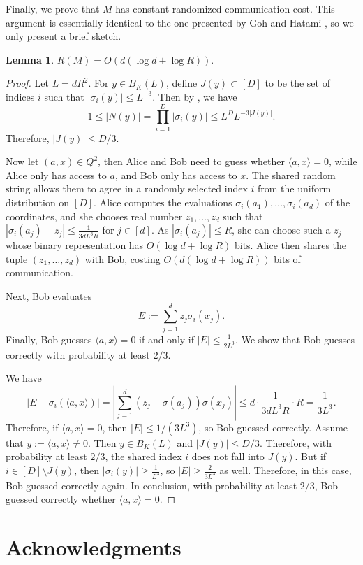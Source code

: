 \documentclass[11pt]{article}
\theoremstyle{plain}
\newtheorem{lemma}[theorem]{Lemma}
\theoremstyle{definition}
\begin{document}
	Finally, we prove that $M$ has constant randomized communication cost. This argument is essentially identical to the one presented by Goh and Hatami \cite{GH_totally_real}, so we only present a brief sketch.
	
	\begin{lemma}
		$R(M)=O(d(\log d+\log R)).$
	\end{lemma}
	
	\begin{proof}
		Let $L=dR^2$. For $y\in B_K(L)$, define $J(y)\subset [D]$ to be the set of indices $i$ such that $|\sigma_i(y)|\leq L^{-3}$. Then by , we have
		$$1\leq |N(y)|=\prod_{i=1}^D |\sigma_i(y)|\leq L^D L^{-3|J(y)|}.$$
		Therefore, $|J(y)|\leq D/3$.
		
		Now let $(a,x)\in Q^2$, then Alice and Bob need to guess whether $\langle a,x\rangle=0$, while Alice only has access to $a$, and Bob only has access to $x$. The shared random string allows them to agree in a randomly selected index $i$  from the uniform distribution on $[D]$. Alice computes the evaluations $\sigma_i(a_1),\dots,\sigma_i(a_d)$ of the coordinates, and she chooses real number $z_1,\dots,z_d$ such that $|\sigma_i(a_j)-z_j|\leq \frac{1}{3dL^3R}$ for $j\in [d]$. As $|\sigma_i(a_j)|\leq R$, she can choose such a $z_j$ whose binary representation has $O(\log d+\log R)$ bits. Alice then shares the tuple $(z_1,\dots,z_d)$ with Bob, costing $O(d(\log d+\log R))$ bits of communication.
		
		Next, Bob evaluates 
		$$E:=\sum_{j=1}^d z_j \sigma_i(x_j).$$
		Finally, Bob guesses $\langle a,x\rangle=0$ if and only if $|E|\leq \frac{1}{2L^3}$. We show that Bob guesses correctly with probability at least $2/3$.
		
		We have
		$$|E-\sigma_i(\langle a,x\rangle)|=\left|\sum_{j=1}^d (z_j-\sigma(a_j))\sigma(x_j)\right|\leq d\cdot \frac{1}{3dL^3R}\cdot R=\frac{1}{3L^3}.$$
		Therefore, if $\langle a,x\rangle=0$, then $|E|\leq 1/(3L^3)$, so Bob guessed correctly. Assume that $y:=\langle a,x\rangle\neq 0$. Then $y\in B_K(L)$ and $|J(y)|\leq D/3$. Therefore, with probability at least $2/3$, the shared index $i$ does not fall into $J(y)$. But if $i\in [D]\setminus J(y)$, then  $|\sigma_i(y)|\geq \frac{1}{L^3}$, so $|E|\geq \frac{2}{3L^3}$ as well. Therefore, in this case, Bob guessed correctly again. In conclusion, with probability at least $2/3$, Bob guessed correctly whether $\langle a,x\rangle=0$.
	\end{proof}
    

    \section*{Acknowledgments}
\end{document}
